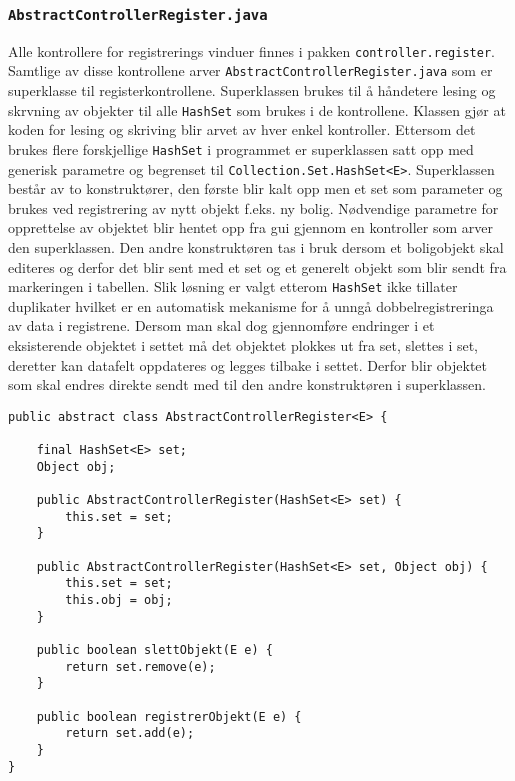 \subsubsection*{\texttt{AbstractControllerRegister.java}}
Alle kontrollere for registrerings vinduer finnes i pakken \texttt{controller.register}. Samtlige av disse kontrollene arver \texttt{AbstractControllerRegister.java} som er superklasse til registerkontrollene. Superklassen brukes til å håndetere lesing og skrvning av objekter til alle \texttt{HashSet} som brukes i de kontrollene. Klassen gjør at koden for lesing og skriving blir arvet av hver enkel kontroller. Ettersom det brukes flere forskjellige \texttt{HashSet} i programmet er superklassen satt opp med generisk parametre og begrenset til \texttt{Collection.Set.HashSet<E>}. Superklassen består av to konstruktører, den første blir kalt opp men et set som parameter og brukes ved registrering av nytt objekt f.eks. ny bolig. Nødvendige parametre for opprettelse av objektet blir hentet opp fra gui gjennom en kontroller som arver den superklassen. Den andre konstruktøren tas i bruk dersom et boligobjekt skal editeres og derfor det blir sent med et set og et generelt objekt som blir sendt fra markeringen i tabellen. Slik løsning er valgt etterom \texttt{HashSet} ikke tillater duplikater hvilket er en automatisk mekanisme for å unngå dobbelregistreringa av data i registrene. Dersom man skal dog gjennomføre endringer i et eksisterende objektet i settet må det objektet plokkes ut fra set, slettes i set, deretter kan datafelt oppdateres og legges tilbake i settet. Derfor blir objektet som skal endres direkte sendt med til den andre konstruktøren i superklassen.



\begin{lstlisting}[caption=\texttt{AbstractControllerRegister.java} kontroller arvet av alle regsitreringskontrollerene.,label=kode:contreg1]
public abstract class AbstractControllerRegister<E> {

    final HashSet<E> set;
    Object obj;

    public AbstractControllerRegister(HashSet<E> set) {
        this.set = set;
    }

    public AbstractControllerRegister(HashSet<E> set, Object obj) {
        this.set = set;
        this.obj = obj;
    }

    public boolean slettObjekt(E e) {
        return set.remove(e);
    }
    
    public boolean registrerObjekt(E e) {
        return set.add(e);
    }
}

\end{lstlisting}



